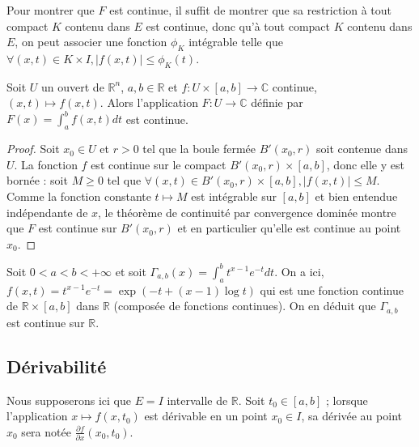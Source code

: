 \begin{rem}
Pour montrer que $F$ est continue, il suffit de montrer que sa restriction à tout compact $K$ contenu dans $E$ est continue, donc qu'à tout compact $K$ contenu dans $E$, on peut associer une fonction $\phi_K$ intégrable telle que $\forall (x,t) \in K \times I, |f(x,t)| \leq \phi_K(t)$.
\end{rem}

\begin{cor}
Soit $U$ un ouvert de $\mathbb{R}^n$, $a,b \in \mathbb{R}$ et $f : U \times [a,b] \to \mathbb{C}$ continue, $(x,t) \mapsto f(x,t)$. Alors l'application $F : U \to \mathbb{C}$ définie par $F(x) = \int_a^b f(x,t) dt$ est continue.
\end{cor}

\begin{proof}
Soit $x_0 \in U$ et $r > 0$ tel que la boule fermée $B'(x_0,r)$ soit contenue dans $U$. La fonction $f$ est continue sur le compact $B'(x_0,r) \times [a,b]$, donc elle y est bornée : soit $M \geq 0$ tel que $\forall (x,t) \in B'(x_0,r) \times [a,b], |f(x,t)| \leq M$. Comme la fonction constante $t \mapsto M$ est intégrable sur $[a,b]$ et bien entendue indépendante de $x$, le théorème de continuité par convergence dominée montre que $F$ est continue sur $B'(x_0,r)$ et en particulier qu'elle est continue au point $x_0$.
\end{proof}

\begin{example}
Soit $0 < a < b < +\infty$ et soit $\Gamma_{a,b}(x) = \int_a^b t^{x-1} e^{-t} dt$. On a ici, $f(x,t) = t^{x-1} e^{-t} = \exp(-t + (x-1)\log t)$ qui est une fonction continue de $\mathbb{R} \times [a,b]$ dans $\mathbb{R}$ (composée de fonctions continues). On en déduit que $\Gamma_{a,b}$ est continue sur $\mathbb{R}$.
\end{example}

\subsection{Dérivabilité}

Nous supposerons ici que $E = I$ intervalle de $\mathbb{R}$. Soit $t_0 \in [a,b]$ ; lorsque l'application $x \mapsto f(x,t_0)$ est dérivable en un point $x_0 \in I$, sa dérivée au point $x_0$ sera notée $\frac{\partial f}{\partial x}(x_0,t_0)$.

